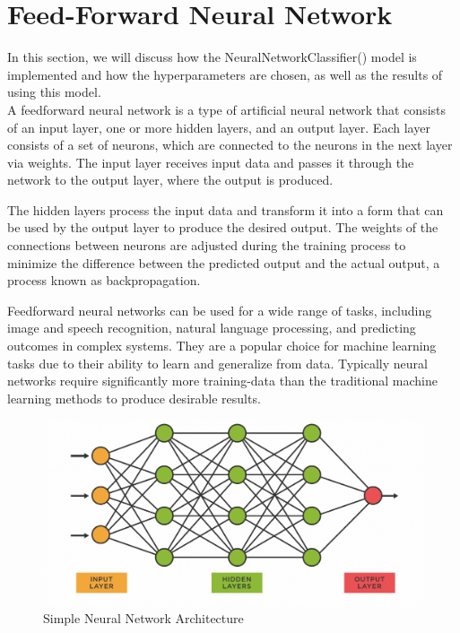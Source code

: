 \section{Feed-Forward Neural Network}
In this section, we will discuss how the NeuralNetworkClassifier() model is implemented and how the hyperparameters are chosen, as well as the results of using this model.\\

A feedforward neural network is a type of artificial neural network that consists of an input layer, one or more hidden layers, and an output layer.
Each layer consists of a set of neurons, which are connected to the neurons in the next layer via weights.
The input layer receives input data and passes it through the network to the output layer, where the output is produced.

The hidden layers process the input data and transform it into a form that can be used by the output layer to produce the desired output.
The weights of the connections between neurons are adjusted during the training process to minimize the difference between the predicted output and the actual output, a process known as backpropagation.

Feedforward neural networks can be used for a wide range of tasks, including image and speech recognition, natural language processing, and predicting outcomes in complex systems.
They are a popular choice for machine learning tasks due to their ability to learn and generalize from data.
Typically neural networks require significantly more training-data than the traditional machine learning methods to produce desirable results.
\\

\begin{figure}[ht]
    \centering
    \includegraphics[scale=0.3]{figures_for_report/simple_neural_network}
    \captionsetup{justification=centering,margin=2cm}
    \caption{Simple Neural Network Architecture}
\end{figure}


